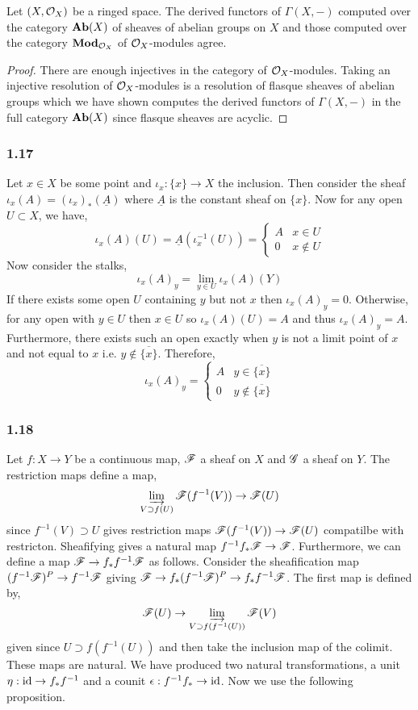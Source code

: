 \documentclass[12pt]{article}
\begin{document}
\begin{proposition}
Let $(X, \mathcal{O}_{X})$ be a ringed space. The derived functors of $\Gamma(X, -)$ computed over the category $\mathbf{Ab}(X)$ of sheaves of abelian groups on $X$ and those computed over the category $\mathbf{Mod}_{\mathcal{O}_{X}}$ of $\mathcal{O}_{X}$-modules agree. 
\end{proposition}

\begin{proof}
There are enough injectives in the category of $\mathcal{O}_{X}$-modules. Taking an injective resolution of $\mathcal{O}_{X}$-modules is a resolution  of flasque sheaves of abelian groups which we have shown computes the derived functors of $\Gamma(X, -)$ in the full category $\mathbf{Ab}(X)$ since flasque sheaves are acyclic. 
\end{proof}

\subsubsection{1.17}

Let $x \in X$ be some point and $\iota_x : \{ x \} \to X$ the inclusion. Then consider the sheaf $\iota_x(A) = (\iota_x)_*(\underline{A})$ where $\underline{A}$ is the constant sheaf on $\{ x \}$. Now for any open $U \subset X$, we have,
\[ \iota_x(A)(U) = \underline{A}(\iota_x^{-1}(U)) = \begin{cases}
A & x \in U
\\
0 & x \notin U
\end{cases} \] 
Now consider the stalks,
\[ \iota_x(A)_y = \lim_{y \in U} \iota_x(A)(Y) \]
If there exists some open $U$ containing $y$ but not $x$ then $\iota_x(A)_y = 0$. Otherwise, for any open with $y \in U$ then $x \in U$ so $\iota_x(A)(U) = A$ and thus $\iota_x(A)_y = A$. Furthermore, there exists such an open exactly when $y$ is not a limit point of $x$ and not equal to $x$ i.e. $y \notin \overline{\{ x \}}$. Therefore, 
\[ \iota_x(A)_y = \begin{cases}
A & y \in \overline{\{ x \}} 
\\
0 & y \notin \overline{\{ x \}}
\end{cases} \]

\subsubsection{1.18}

Let $f : X \to Y$ be a continuous map, $\mathscr{F}$ a sheaf on $X$ and $\mathscr{G}$ a sheaf on $Y$. The restriction maps define a map,
\[ \varinjlim_{V \supset f(U)} \mathscr{F}(f^{-1}(V)) \to \mathscr{F}(U) \]
since $f^{-1}(V) \supset U$ gives restriction maps $\mathscr{F}(f^{-1}(V)) \to \mathscr{F}(U)$ compatilbe with restricton. Sheafifying gives a natural map $f^{-1} f_* \mathscr{F} \to \mathscr{F}$. Furthermore, we can define a map $\mathscr{F} \to f_* f^{-1} \mathscr{F}$ as follows. Consider the sheafification map $(f^{-1} \mathscr{F})^P \to f^{-1} \mathscr{F}$ giving $\mathscr{F} \to f_* (f^{-1} \mathscr{F})^P \to f_* f^{-1} \mathscr{F}$. The first map is defined by,
\[ \mathscr{F}(U) \to \varinjlim_{V \supset f(f^{-1}(U))} \mathscr{F}(V) \]
given since $U \supset f(f^{-1}(U))$ and then take the inclusion map of the colimit. These maps are natural. We have produced two natural transformations, a unit $\eta : \mathrm{id} \to f_* f^{-1}$ and a counit $\epsilon : f^{-1} f_* \to \mathrm{id}$. Now we use the following proposition.
\end{document}
